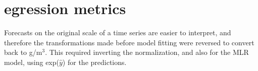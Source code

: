 
\section{egression metrics}
Forecasts on the original scale of a time series are easier to interpret, and therefore the transformations made before model fitting were reversed to convert back to \textmugreek g/m$^3$. This required inverting the normalization, and also for the MLR model, using exp($\hat{y}$) for the predictions. 





 
